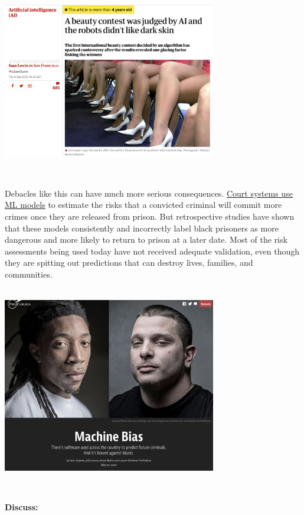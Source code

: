 \documentclass[]{book}
\begin{document}
~\\

\includegraphics[width=0.7\textwidth,height=\textheight]{img/ethics-machine_bias.png}

~

Debacles like this can have much more serious consequences. \href{https://www.propublica.org/article/machine-bias-risk-assessments-in-criminal-sentencing}{Court systems use ML models} to estimate the risks that a convicted criminal will commit more crimes once they are released from prison. But retrospective studies have shown that these models consistently and incorrectly label black prisoners as more dangerous and more likely to return to prison at a later date. Most of the risk assessments being used today have not received adequate validation, even though they are spitting out predictions that can destroy lives, families, and communities.

~\\

\includegraphics[width=0.7\textwidth,height=\textheight]{img/ethics-2.png}

~

\textbf{Discuss:}
\end{document}
